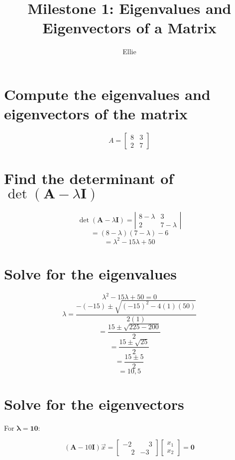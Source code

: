 \documentclass[14pt]{article}
\title{Milestone 1: Eigenvalues and Eigenvectors of a Matrix}
\author{Ellie}
\begin{document}
\maketitle

\section{Compute the eigenvalues and eigenvectors of the matrix}
 
  $$
    A = \left[\begin{array}{ll}
    8 & 3  \\
    2 & 7 
    \end{array}\right]
  $$

\section{Find the determinant of $\det(\mathbf{A} - \lambda\mathbf{I})$}
   $$
    \det(\mathbf{A} - \lambda\mathbf{I}) = \left|\begin{array}{ll}
    8-\lambda & 3  \\
    2 & 7-\lambda 
    \end{array}\right|
    $$
    $$
    = (8-\lambda)(7-\lambda) - 6
    $$
    $$
    = \lambda^2 - 15\lambda + 50
    $$

\section{Solve for the eigenvalues}
    $$
    \lambda^2 - 15\lambda + 50 = 0
    $$
    $$
    \lambda = \frac{-(-15) \pm \sqrt{(-15)^2 - 4(1)(50)}}{2(1)}
    $$
    $$
    = \frac{15 \pm \sqrt{225 - 200}}{2}
    $$
    $$
    = \frac{15 \pm \sqrt{25}}{2}
    $$
    $$
    = \frac{15 \pm 5}{2}
    $$
    $$
    = 10, 5
    $$

\section{Solve for the eigenvectors}

\begin{flushleft}
For $\boldsymbol{\lambda = 10}$:
\end{flushleft}

$$
(\mathbf{A} - 10\mathbf{I})\vec{x} = \left[\begin{array}{ll}
-2 & \phantom{-}3  \\
\phantom{-}2 & -3 
\end{array}\right] \begin{bmatrix}
x_1 \\
x_2
\end{bmatrix} = \mathbf{0}
$$
\end{document}
